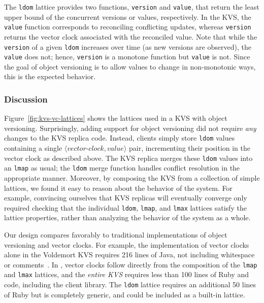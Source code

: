 The \texttt{ldom} lattice provides two functions, \texttt{version} and
\texttt{value}, that return the least upper bound of the concurrent versions or
values, respectively. In the KVS, the \texttt{value} function corresponds to
reconciling conflicting updates, whereas \texttt{version} returns the vector
clock associated with the reconciled value. Note that while the \texttt{version}
of a given \texttt{ldom} increases over time (as new versions are observed), the
\texttt{value} does not; hence, \texttt{version} is a monotone function but
\texttt{value} is not. Since the goal of object versioning is to allow values to
change in non-monotonic ways, this is the expected behavior.

\subsubsection{Discussion}
Figure~\ref{fig:kvs-vc-lattices} shows the lattices used in a KVS with object
versioning. Surprisingly, adding support for object versioning did not require
\emph{any} changes to the KVS replica code. Instead, clients simply store
\texttt{ldom} values containing a single
$\langle\textit{vector-clock},\textit{value}\rangle$ pair, incrementing their
position in the vector clock as described above. The KVS replica merges these
\texttt{ldom} values into an \texttt{lmap} as usual; the \texttt{ldom} merge
function handles conflict resolution in the appropriate manner. Moreover, by
composing the KVS from a collection of simple lattices, we found it easy to
reason about the behavior of the system. For example, convincing ourselves that
KVS replicas will eventually converge only required checking that the individual
\texttt{ldom}, \texttt{lmap}, and \texttt{lmax} lattices satisfy the lattice
properties, rather than analyzing the behavior of the system as a whole.

Our design compares favorably to traditional implementations of object
versioning and vector clocks. For example, the implementation of vector clocks
alone in the Voldemort KVS requires 216 lines of Java, not including whitespace
or comments~\cite{voldemort-vector-clock}. In \lang, vector clocks follow
directly from the composition of the \texttt{lmap} and \texttt{lmax} lattices,
and the \emph{entire KVS} requires less than 100 lines of Ruby and \lang code,
including the client library. The \texttt{ldom} lattice requires an additional
50 lines of Ruby but is completely generic, and could be included as a built-in
lattice.

